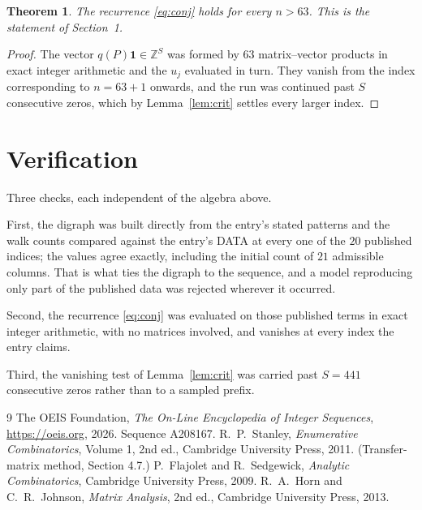 \documentclass[11pt,a4paper]{article}
\theoremstyle{plain}
\newtheorem{theorem}{Theorem}
\theoremstyle{definition}
\begin{document}
\begin{theorem}
The recurrence \eqref{eq:conj} holds for every $n>63$. This is the statement of
Section~1.
\end{theorem}

\begin{proof}
The vector $q(P)\mathbf{1}\in\mathbb{Z}^{S}$ was formed by $63$ matrix--vector
products in exact integer arithmetic and the $u_j$ evaluated in turn. They vanish from the
index corresponding to $n=63+1$ onwards, and the run was continued past $S$ consecutive
zeros, which by Lemma~\ref{lem:crit} settles every larger index.
\end{proof}

\section{Verification}

Three checks, each independent of the algebra above.

First, the digraph was built directly from the entry's stated patterns and the walk counts
compared against the entry's DATA at every one of the $20$ published indices; the
values agree exactly, including the initial count of $21$ admissible columns. That is
what ties the digraph to the sequence, and a model reproducing only part of the published
data was rejected wherever it occurred.

Second, the recurrence \eqref{eq:conj} was evaluated on those published terms in exact
integer arithmetic, with no matrices involved, and vanishes at every index the entry claims.

Third, the vanishing test of Lemma~\ref{lem:crit} was carried past $S=441$ consecutive
zeros rather than to a sampled prefix.

\begin{thebibliography}{9}
 The OEIS Foundation, \emph{The On-Line Encyclopedia of Integer
Sequences}, \url{https://oeis.org}, 2026. Sequence A208167.
 R.~P.~Stanley, \emph{Enumerative Combinatorics}, Volume 1, 2nd ed.,
Cambridge University Press, 2011. (Transfer-matrix method, Section 4.7.)
 P.~Flajolet and R.~Sedgewick, \emph{Analytic Combinatorics}, Cambridge
University Press, 2009.
 R.~A.~Horn and C.~R.~Johnson, \emph{Matrix Analysis}, 2nd ed., Cambridge
University Press, 2013.
\end{thebibliography}
\end{document}

